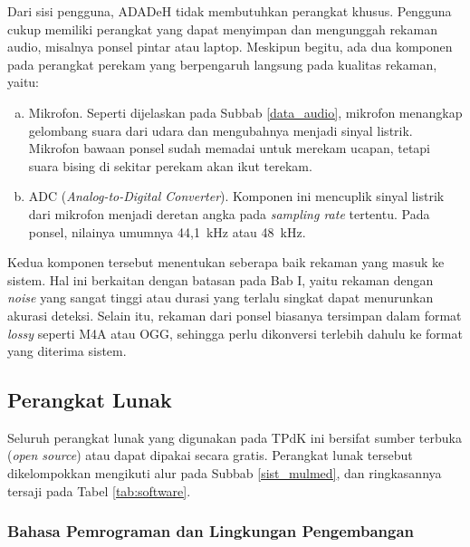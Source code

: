 Dari sisi pengguna, ADADeH tidak membutuhkan perangkat khusus. Pengguna cukup memiliki perangkat yang dapat menyimpan dan mengunggah rekaman audio, misalnya ponsel pintar atau laptop. Meskipun begitu, ada dua komponen pada perangkat perekam yang berpengaruh langsung pada kualitas rekaman, yaitu:
\begin{enumerate}[(a).]
  \item Mikrofon. Seperti dijelaskan pada Subbab \ref{data_audio}, mikrofon menangkap gelombang suara dari udara dan mengubahnya menjadi sinyal listrik. Mikrofon bawaan ponsel sudah memadai untuk merekam ucapan, tetapi suara bising di sekitar perekam akan ikut terekam.
  \item ADC (\textit{Analog-to-Digital Converter}). Komponen ini mencuplik sinyal listrik dari mikrofon menjadi deretan angka pada \textit{sampling rate} tertentu. Pada ponsel, nilainya umumnya 44,1~kHz atau 48~kHz.
\end{enumerate}

Kedua komponen tersebut menentukan seberapa baik rekaman yang masuk ke sistem. Hal ini berkaitan dengan batasan pada Bab I, yaitu rekaman dengan \textit{noise} yang sangat tinggi atau durasi yang terlalu singkat dapat menurunkan akurasi deteksi.
Selain itu, rekaman dari ponsel biasanya tersimpan dalam format \textit{lossy} seperti M4A atau OGG, sehingga perlu dikonversi terlebih dahulu ke format yang diterima sistem.

\subsection{Perangkat Lunak}
\label{software}

Seluruh perangkat lunak yang digunakan pada TPdK ini bersifat sumber terbuka (\textit{open source}) atau dapat dipakai secara gratis. Perangkat lunak tersebut dikelompokkan mengikuti alur pada Subbab \ref{sist_mulmed}, dan ringkasannya tersaji pada Tabel \ref{tab:software}.

\subsubsection{Bahasa Pemrograman dan Lingkungan Pengembangan}
\label{sw_env}

